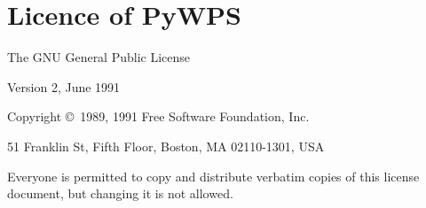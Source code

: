 \documentclass[a4paper,11pt]{article}
\begin{document}
    \section{Licence of PyWPS}

\begin{center}
{\Large The GNU General Public License}

{\parindent 0in

Version 2, June 1991

Copyright \copyright\ 1989, 1991 Free Software Foundation, Inc.

\bigskip

51 Franklin St, Fifth Floor, Boston, MA  02110-1301, USA

\bigskip

Everyone is permitted to copy and distribute verbatim copies
of this license document, but changing it is not allowed.
}
\end{center}
\end{document}
